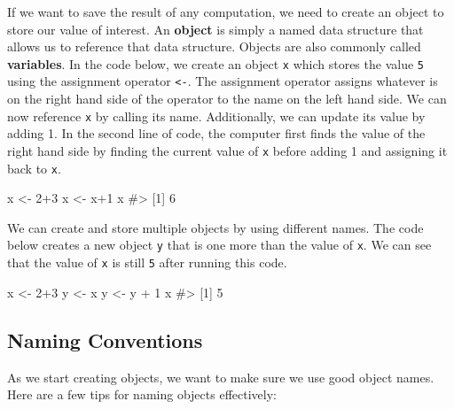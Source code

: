 \documentclass[
  letterpaper,
]{krantz}
\makeatletter
\newenvironment{Shaded}{\begin{snugshade}}{\end{snugshade}}
\newcommand{\CommentTok}[1]{\textcolor[rgb]{0.37,0.37,0.37}{#1}}
\newcommand{\DecValTok}[1]{\textcolor[rgb]{0.68,0.00,0.00}{#1}}
\newcommand{\NormalTok}[1]{\textcolor[rgb]{0.00,0.23,0.31}{#1}}
\newcommand{\OtherTok}[1]{\textcolor[rgb]{0.00,0.23,0.31}{#1}}
\newcommand{\SpecialCharTok}[1]{\textcolor[rgb]{0.37,0.37,0.37}{#1}}
\newenvironment{kframe}{%
\medskip{}
\setlength{\fboxsep}{.8em}
 \def\at@end@of@kframe{}%
 \ifinner\ifhmode%
  \def\at@end@of@kframe{\end{minipage}}%
  \begin{minipage}{\columnwidth}%
 \fi\fi%
 \def\FrameCommand##1{\hskip\@totalleftmargin \hskip-\fboxsep
 \colorbox{shadecolor}{##1}\hskip-\fboxsep
     \hskip-\linewidth \hskip-\@totalleftmargin \hskip\columnwidth}%
 \MakeFramed {\advance\hsize-\width
   \@totalleftmargin\z@ \linewidth\hsize
   \@setminipage}}%
 {\par\unskip\endMakeFramed%
 \at@end@of@kframe}
\renewenvironment{Shaded}{\begin{kframe}}{\end{kframe}}
\makeatother
\begin{document}
If we want to save the result of any computation, we need to create an
object to store our value of interest. An \textbf{object} is simply a
named data structure that allows us to reference that data structure.
Objects are also commonly called \textbf{variables}. In the code below,
we create an object \texttt{x} which stores the value \texttt{5} using
the assignment operator \texttt{\textless{}-}. The assignment operator
assigns whatever is on the right hand side of the operator to the name
on the left hand side. We can now reference \texttt{x} by calling its
name. Additionally, we can update its value by adding 1. In the second
line of code, the computer first finds the value of the right hand side
by finding the current value of \texttt{x} before adding 1 and assigning
it back to \texttt{x}.

\begin{Shaded}
\begin{Highlighting}[]
\NormalTok{x }\OtherTok{\textless{}{-}} \DecValTok{2}\SpecialCharTok{+}\DecValTok{3}
\NormalTok{x }\OtherTok{\textless{}{-}}\NormalTok{ x}\SpecialCharTok{+}\DecValTok{1}
\NormalTok{x}
\CommentTok{\#\textgreater{} [1] 6}
\end{Highlighting}
\end{Shaded}

We can create and store multiple objects by using different names. The
code below creates a new object \texttt{y} that is one more than the
value of \texttt{x}. We can see that the value of \texttt{x} is still
\texttt{5} after running this code.

\begin{Shaded}
\begin{Highlighting}[]
\NormalTok{x }\OtherTok{\textless{}{-}} \DecValTok{2}\SpecialCharTok{+}\DecValTok{3}
\NormalTok{y }\OtherTok{\textless{}{-}}\NormalTok{ x}
\NormalTok{y }\OtherTok{\textless{}{-}}\NormalTok{ y }\SpecialCharTok{+} \DecValTok{1}
\NormalTok{x}
\CommentTok{\#\textgreater{} [1] 5}
\end{Highlighting}
\end{Shaded}

\hypertarget{naming-conventions}{%
\subsection{Naming Conventions}\label{naming-conventions}}

As we start creating objects, we want to make sure we use good object
names. Here are a few tips for naming objects effectively:
\end{document}
